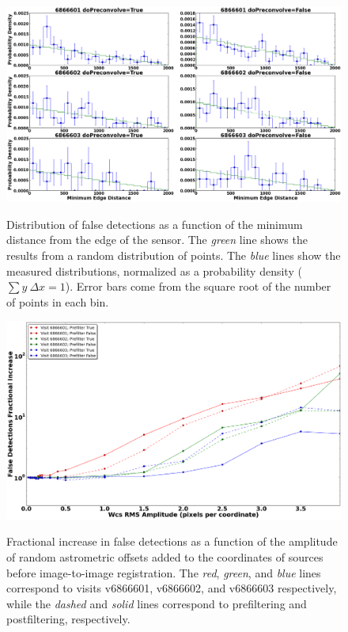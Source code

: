\documentclass[prd, nofootinbib, floatfix, 11pt,tightenlines,times]{article}
\begin{document}
\begin{figure}
\includegraphics[width=1.0\textwidth]{figures/edge.eps} \\
\caption{Distribution of false detections as a function of the minimum
  distance from the edge of the sensor.  The {\it green} line shows
  the results from a random distribution of points.  The {\it blue}
  lines show the measured distributions, normalized as a probability
  density ($\sum y~\Delta x = 1$).  Error bars come from the square
  root of the number of points in each bin. }
\label{edgedist}
\end{figure}


\begin{figure}
\includegraphics[width=1.0\textwidth]{figures/wcs_rms.eps} \\
\caption{Fractional increase in false detections as a function of the
  amplitude of random astrometric offsets added to the coordinates of
  sources before image-to-image registration.  The {\it red}, {\it
    green}, and {\it blue} lines correspond to visits v6866601,
  v6866602, and v6866603 respectively, while the {\it dashed} and {\it
    solid} lines correspond to prefiltering and postfiltering,
  respectively.}
\label{wcsrms}
\end{figure}
\end{document}
